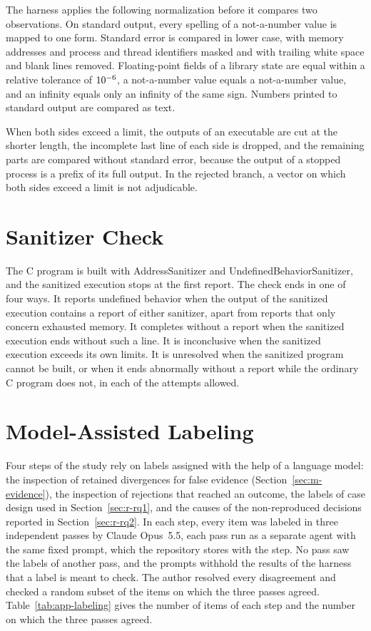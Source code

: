 The harness applies the following normalization before it compares two observations. On standard output, every spelling of a not-a-number value is mapped to one form. Standard error is compared in lower case, with memory addresses and process and thread identifiers masked and with trailing white space and blank lines removed. Floating-point fields of a library state are equal within a relative tolerance of $10^{-6}$, a not-a-number value equals a not-a-number value, and an infinity equals only an infinity of the same sign. Numbers printed to standard output are compared as text.

When both sides exceed a limit, the outputs of an executable are cut at the shorter length, the incomplete last line of each side is dropped, and the remaining parts are compared without standard error, because the output of a stopped process is a prefix of its full output. In the rejected branch, a vector on which both sides exceed a limit is not adjudicable.

\section{Sanitizer Check}\label{app:s-sanitizer}

The C program is built with AddressSanitizer and UndefinedBehaviorSanitizer, and the sanitized execution stops at the first report. The check ends in one of four ways. It reports undefined behavior when the output of the sanitized execution contains a report of either sanitizer, apart from reports that only concern exhausted memory. It completes without a report when the sanitized execution ends without such a line. It is inconclusive when the sanitized execution exceeds its own limits. It is unresolved when the sanitized program cannot be built, or when it ends abnormally without a report while the ordinary C program does not, in each of the attempts allowed.

\section{Model-Assisted Labeling}\label{app:s-labeling}

Four steps of the study rely on labels assigned with the help of a language model: the inspection of retained divergences for false evidence (Section~\ref{sec:m-evidence}), the inspection of rejections that reached an outcome, the labels of case design used in Section~\ref{sec:r-rq1}, and the causes of the non-reproduced decisions reported in Section~\ref{sec:r-rq2}. In each step, every item was labeled in three independent passes by Claude Opus~5.5, each pass run as a separate agent with the same fixed prompt, which the repository stores with the step. No pass saw the labels of another pass, and the prompts withhold the results of the harness that a label is meant to check. The author resolved every disagreement and checked a random subset of the items on which the three passes agreed. Table~\ref{tab:app-labeling} gives the number of items of each step and the number on which the three passes agreed.

